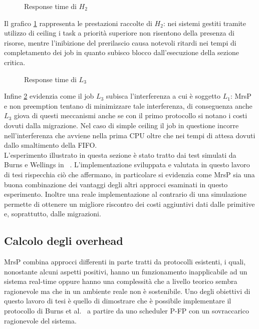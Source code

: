 \begin{figure}
  \centering
  \confrontoProtocolliHDue
  \caption{Response time di $H_2$}
  \label{fig:test_protocols_H2}
\end{figure}

\noindent Il grafico \ref{fig:test_protocols_H2} rappresenta le prestazioni raccolte di $H_2$: nei sistemi gestiti tramite utilizzo di ceiling i task a priorità superiore non risentono della presenza di risorse, mentre l'inibizione del prerilascio causa notevoli ritardi nei tempi di completamento dei job in quanto subisco blocco dall'esecuzione della sezione critica.\\

\begin{figure}
  \centering
  \confrontoProtocolliLTre
  \caption{Response time di $L_3$}
  \label{fig:test_protocols_L3}
\end{figure}

\noindent Infine \ref{fig:test_protocols_L3} evidenzia come il job $L_3$ subisca l'interferenza a cui è soggetto $L_1$: MrsP e non preemption tentano di minimizzare tale interferenza, di conseguenza anche $L_3$ giova di questi meccanismi anche se con il primo protocollo si notano i costi dovuti dalla migrazione. Nel caso di simple ceiling il job in questione incorre nell'interferenza che avviene nella prima CPU oltre che nei tempi di attesa dovuti dallo smaltimento della FIFO.\\

\noindent L'esperimento illustrato in questa sezione è stato tratto dai test simulati da Burns e Wellings in ~\cite{Burns:2013:SCM:2547348.2547350}. L'implementazione sviluppata e valutata in questo lavoro di tesi rispecchia ciò che affermano, in particolare si evidenzia come MrsP sia una buona combinazione dei vantaggi degli altri approcci esaminati in questo esperimento. Inoltre una reale implementazione al contrario di una simulazione permette di ottenere un migliore riscontro dei costi aggiuntivi dati dalle primitive e, soprattutto, dalle migrazioni.\\

\newpage

\subsection{Calcolo degli overhead}
\label{sec:overhead}

\noindent MrsP combina approcci differenti in parte tratti da protocolli esistenti, i quali, nonostante alcuni aspetti positivi, hanno un funzionamento inapplicabile ad un sistema real-time oppure hanno una complessità che a livello teorico sembra ragionevole ma che in un ambiente reale non è sostenibile. Uno degli obiettivi di questo lavoro di tesi è quello di dimostrare che è possibile implementare il protocollo di Burns et al.~\cite{Burns:2013:SCM:2547348.2547350} a partire da uno scheduler P-FP con un sovraccarico ragionevole del sistema.

